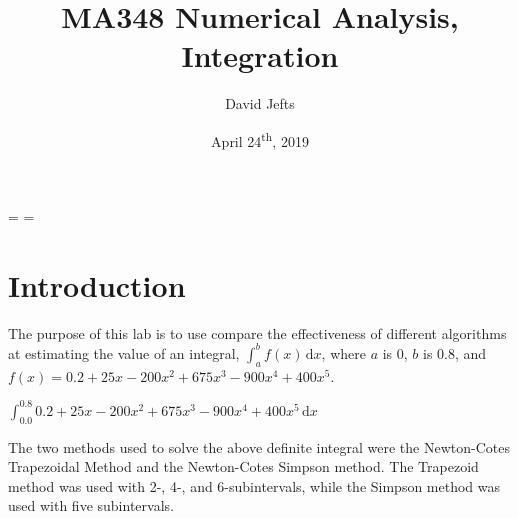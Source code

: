 \documentclass[12pt, letterpaper]{article}
\begin{document}
\setcounter{secnumdepth}{-1}
\binoppenalty=\maxdimen
\relpenalty=\maxdimen

\setlength{\abovedisplayskip}{-0.5\baselineskip}
\setlength{\belowdisplayskip}{0\baselineskip}
\setlength{\abovedisplayshortskip}{0\baselineskip}
\setlength{\belowdisplayshortskip}{0\baselineskip}

\title{MA348 Numerical Analysis, Integration}
\author{David Jefts}
\date{April 24\textsuperscript{th}, 2019}
\begin{titlepage}
	\centering
	\maketitle
	\centering
	\hfill
	\vfill
	\thispagestyle{empty}
\end{titlepage}

\setlength{\voffset}{-0.5in}
\setlength{\headsep}{10pt}

\section{\label{sec:intro}Introduction}
	The purpose of this lab is to use compare the effectiveness of different algorithms at estimating the value of an integral, $\displaystyle\int_{a}^{b}\!{f(x)}\,\mathrm{d}x$, where $a$ is 0, $b$ is 0.8, and $f(x)={0.2+25x-200x^2+675x^3-900x^4+400x^5}$.
	
	$\displaystyle\int_{0.0}^{0.8}\!{0.2+25x-200x^2+675x^3-900x^4+400x^5}\,\mathrm{d}x$
	 
	 The two methods used to solve the above definite integral were the Newton-Cotes Trapezoidal Method and the Newton-Cotes Simpson method. The Trapezoid method was used with 2-, 4-, and 6-subintervals, while the Simpson method was used with five subintervals.

\end{document}
